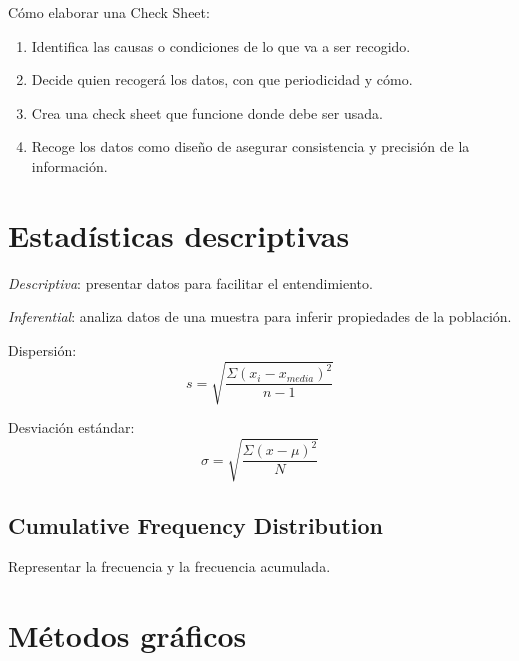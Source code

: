 \documentclass[oneside]{book}
\begin{document}
Cómo elaborar una Check Sheet:

\begin{enumerate}
	\item Identifica las causas o condiciones de lo que va a ser recogido.
	\item Decide quien recogerá los datos, con que periodicidad y cómo.
	\item Crea una check sheet que funcione donde debe ser usada.
	\item Recoge los datos como diseño de asegurar consistencia y precisión de la información.
\end{enumerate}

\section{Estadísticas descriptivas}

\textit{Descriptiva}: presentar datos para facilitar el entendimiento.

\textit{Inferential}: analiza datos de una muestra para inferir propiedades de la población. 

Dispersión: 
\begin{equation}
s = \sqrt{\frac{\Sigma(x_i-x_{media})^2}{n-1}}
\end{equation}

Desviación estándar:
\begin{equation}
\sigma = \sqrt{\frac{\Sigma(x-\mu)^2}{N}}
\end{equation}

\subsection{Cumulative Frequency Distribution}

Representar la frecuencia y la frecuencia acumulada.

\section{Métodos gráficos}
\end{document}
